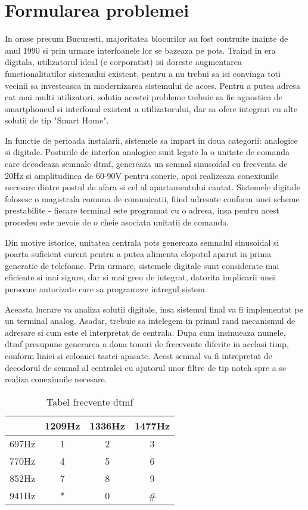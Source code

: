 \section {Formularea problemei}

In orase precum Bucuresti, majoritatea blocurilor au fost contruite inainte de anul 1990 si prin urmare interfoanele lor se bazeaza pe \acrshort{pots}. Traind in era digitala, utilizatorul ideal (e corporatist) isi doreste augmentarea functionalitatilor sistemului existent, pentru a nu trebui sa isi convinga toti vecinii sa investeasca in modernizarea sistemului de acces. Pentru a putea adresa cat mai multi utilizatori, solutia acestei probleme trebuie sa fie agnostica de smartphoneul si interfonul existent a utilizatorului, dar sa ofere integrari cu alte solutii de tip "Smart Home".

In functie de perioada instalarii, sistemele sa impart in doua categorii: analogice si digitale. Posturile de interfon analogice sunt legate la o unitate de comanda care decodeaza semnale \acrfull{dtmf}, genereaza un semnal sinusoidal cu frecventa de 20Hz si amplitudinea de 60-90V pentru sonerie, apoi realizeaza conexiunile necesare dintre postul de afara si cel al apartamentului cautat. Sistemele digitale folosesc o magistrala comuna de comunicatii, fiind adresate conform unei scheme prestabilite - fiecare terminal este programat cu o adresa, insa pentru acest procedeu este nevoie de o cheie asociata unitatii de comanda.

Din motive istorice, unitatea centrala \acrshort{pots} genereaza semnalul sinusoidal si poarta suficient curent pentru a putea alimenta clopotul aparut in prima generatie de telefoane. Prin urmare, sistemele digitale sunt considerate mai eficiente si mai sigure, dar si mai greu de integrat, datorita implicarii unei persoane autorizate care sa programeze intregul sistem.

Aceasta lucrare va analiza solutii digitale, insa sistemul final va fi implementat pe un terminal analog. Asadar, trebuie sa intelegem in primul rand mecanismul de adresare si cum este el interpretat de centrala. Dupa cum insinueaza numele, \acrshort{dtmf} presupune generarea a doua tonuri de frecevente diferite in acelasi timp, conform liniei si coloanei tastei apasate. Acest semnal va fi intrepretat de decodorul de semnal al centralei cu ajutorul unor filtre de tip notch spre a se realiza conexiunile necesare. 

\begin{table}[ht!]
\begin{tabular}{c||c|c|c}
 & 1209Hz & 1336Hz & 1477Hz \\
\hline
\hline
697Hz & 1 & 2 & 3 \\
\hline
770Hz & 4 & 5 & 6 \\
\hline
852Hz & 7 & 8 & 9 \\
\hline
941Hz & * & 0 & \# \\
\end{tabular}
\centering
\caption{Tabel frecvente \acrshort{dtmf}}
\label{tab:dtmf}
\end{table}

